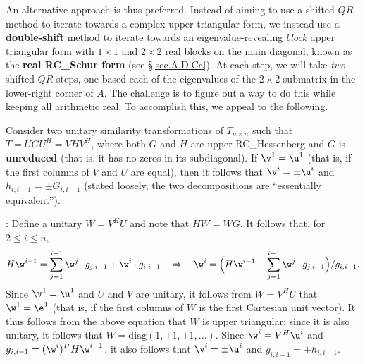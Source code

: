 \begin{figure*}[t]
\end{figure*}

\noindent An alternative approach is thus preferred.  Instead of aiming to use a shifted $QR$ method to iterate towards a complex upper triangular form,
we instead use a {\bf double-shift} method to iterate towards an eigenvalue-revealing {\it block} upper triangular form with $1\times 1$ and $2\times 2$ real blocks on the
main diagonal, known as the {\bf real RC_Schur form} (see \S \ref{sec.A.D.Ca}).  At each step, we will take {\it two} shifted $QR$ steps, one based each of the eigenvalues of the $2\times 2$ submatrix in the
lower-right corner of $A$.  The challenge is to figure out a way to do this while keeping all arithmetic real.  To accomplish this, we appeal to the following.

\begin{fact} \label{fact.implicitQ}
Consider two unitary similarity transformations of $T_{n\times n}$ such that\break $T = U G U^H = V H V^H$, where both $G$ and $H$ are upper RC_Hessenberg and $G$ is {\bf unreduced} (that is, it has no zeros
in its subdiagonal).  If $\v^1=\u^1$ (that is, if the first columns of $V$ and $U$ are equal), then it follows that $\v^i=\pm\u^i$ and $h_{i,i-1}=\pm G_{i,i-1}$ (stated loosely, the two decompositions
are ``essentially equivalent'').
\end{fact}

\/: Define a unitary $W=V^H U$ and note that $HW = WG$.   It follows that, for $2\le i\le n$,
\begin{equation*}
H\w^{i-1} = \sum_{j=1}^{i-1} \w^j \cdot g_{j,i-1}  + \w^i \cdot g_{i,i-1} \quad \Rightarrow \quad \w^i = \Big( H\w^{i-1} - \sum_{j=1}^{i-1} \w^j \cdot g_{j,i-1} \Big)/ g_{i,i-1}.
\end{equation*}
Since $\v^1=\u^1$ and $U$ and $V$ are unitary, it follows from $W=V^H U$ that $\w^1=\e^1$ (that is, if the first columns of $W$ is the first Cartesian unit vector).
It thus follows from the above equation that $W$ is upper triangular; since it is also unitary, it follows that $W=\textrm{diag}(1,\pm 1,\pm 1,\ldots)$.
Since $\w^i=V^H \u^i$ and $g_{i,i-1}=(\w^i)^H H \w^{i-1}$, it also follows that $\v^i=\pm \u^i$ and $g_{i,i-1}=\pm h_{i,i-1}$.  \endproof

